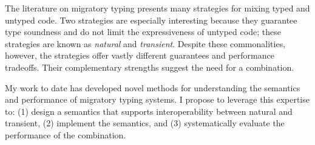 The literature on migratory typing presents many strategies for
 mixing typed and untyped code.
Two strategies are especially interesting because they
 guarantee type soundness and do not limit the expressiveness of untyped code;
 these strategies are known as \emph{natural}\/ and \emph{transient}\/.
Despite these commonalities, however, the strategies offer vastly different
 guarantees and performance tradeoffs.
Their complementary strengths suggest the need for a combination.

My work to date has developed novel methods for understanding the semantics
 and performance of migratory typing systems.
I propose to leverage this expertise to:
 (1) design a semantics that supports interoperability between natural and transient,
 (2) implement the semantics,
 and (3) systematically evaluate the performance of the combination.
